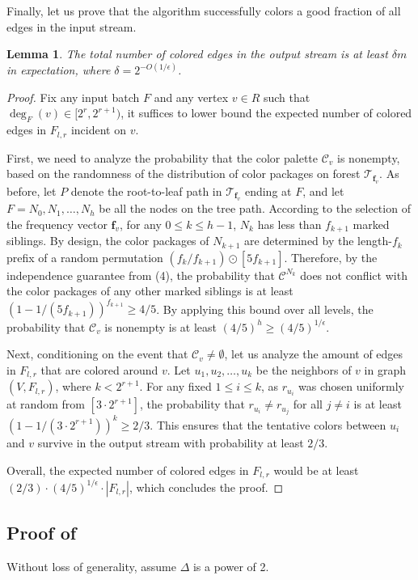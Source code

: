 \documentclass[11pt,a4paper]{article}
\newtheorem{lemma}{Lemma}[section]
\newcommand{\tree}{\mathcal{T}}
\newcommand{\freq}{\mathbf{f}}
\newcommand{\clr}{\mathcal{C}}
\begin{document}
Finally, let us prove that the algorithm successfully colors a good fraction of all edges in the input stream.
\begin{lemma}
	The total number of colored edges in the output stream is at least $\delta m$ in expectation, where $\delta = 2^{-O(1/\epsilon)}$.
\end{lemma}
\begin{proof}
	Fix any input batch $F$ and any vertex $v\in R$ such that $\deg_F(v)\in [2^r, 2^{r+1})$, it suffices to lower bound the expected number of colored edges in $F_{l, r}$ incident on $v$.
	
	First, we need to analyze the probability that the color palette $\clr_v$ is nonempty, based on the randomness of the distribution of color packages on forest $\tree_{\freq_v}$. As before, let $P$ denote the root-to-leaf path in $\tree_{\freq_v}$ ending at $F$, and let $F = N_0, N_1, \ldots, N_h$ be all the nodes on the tree path. According to the selection of the frequency vector $\freq_v$, for any $0\leq k\leq h-1$, $N_k$ has less than $f_{k + 1}$ marked siblings. By design, the color packages of $N_{k + 1}$ are determined by the length-$f_{k}$ prefix of a random permutation $(f_{k} / f_{k + 1})\odot [5f_{k + 1}]$. Therefore, by the independence guarantee from (4), the probability that $\clr^{N_k}$ does not conflict with the color packages of any other marked siblings is at least $(1 - 1/(5f_{k + 1}))^{f_{k + 1}} \ge  4/5$. By applying this bound over all levels, the probability that $\clr_v$ is nonempty is at least $(4/5)^{h} \geq (4/5)^{1/\epsilon}$.
	
	Next, conditioning on the event that $\clr_v\neq \emptyset$, let us analyze the amount of edges in $F_{l, r}$ that are colored around $v$. Let $u_1, u_2, \ldots, u_k$ be the neighbors of $v$ in graph $(V, F_{l, r})$, where $k < 2^{r+1}$. For any fixed $1\leq i\leq k$, as $r_{u_i}$ was chosen uniformly at random from $[3\cdot 2^{r+1}]$, the probability that $r_{u_i}\neq r_{u_j}$ for all $j\neq i$ is at least $(1 - 1 / (3 \cdot 2^{r + 1}))^k \ge 2/3$. This ensures that the tentative colors between $u_i$ and $v$ survive in the output stream with probability at least $2/3$.
	
	Overall, the expected number of colored edges in $F_{l, r}$ would be at least $(2/3)\cdot (4/5)^{1/\epsilon}\cdot |F_{l, r}|$, which concludes the proof.
\end{proof}


\subsection{Proof of } \label{subsec:high}
Without loss of generality, assume $\Delta$ is a power of 2. 
\end{document}
